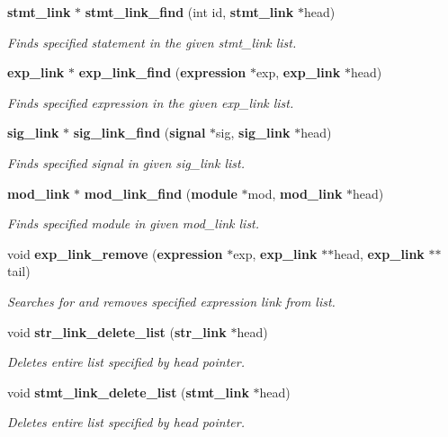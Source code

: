 \begin{CompactItemize}
{\bf stmt\_\-link} $\ast$ {\bf stmt\_\-link\_\-find} (int id, {\bf stmt\_\-link} $\ast$head)
\begin{CompactList}\small\item\em Finds specified statement in the given stmt\_\-link list.\item\end{CompactList}\item 
{\bf exp\_\-link} $\ast$ {\bf exp\_\-link\_\-find} ({\bf expression} $\ast$exp, {\bf exp\_\-link} $\ast$head)
\begin{CompactList}\small\item\em Finds specified expression in the given exp\_\-link list.\item\end{CompactList}\item 
{\bf sig\_\-link} $\ast$ {\bf sig\_\-link\_\-find} ({\bf signal} $\ast$sig, {\bf sig\_\-link} $\ast$head)
\begin{CompactList}\small\item\em Finds specified signal in given sig\_\-link list.\item\end{CompactList}\item 
{\bf mod\_\-link} $\ast$ {\bf mod\_\-link\_\-find} ({\bf module} $\ast$mod, {\bf mod\_\-link} $\ast$head)
\begin{CompactList}\small\item\em Finds specified module in given mod\_\-link list.\item\end{CompactList}\item 
void {\bf exp\_\-link\_\-remove} ({\bf expression} $\ast$exp, {\bf exp\_\-link} $\ast$$\ast$head, {\bf exp\_\-link} $\ast$$\ast$tail)
\begin{CompactList}\small\item\em Searches for and removes specified expression link from list.\item\end{CompactList}\item 
void {\bf str\_\-link\_\-delete\_\-list} ({\bf str\_\-link} $\ast$head)
\begin{CompactList}\small\item\em Deletes entire list specified by head pointer.\item\end{CompactList}\item 
void {\bf stmt\_\-link\_\-delete\_\-list} ({\bf stmt\_\-link} $\ast$head)
\begin{CompactList}\small\item\em Deletes entire list specified by head pointer.\item\end{CompactList}\item 

\end{CompactItemize}
